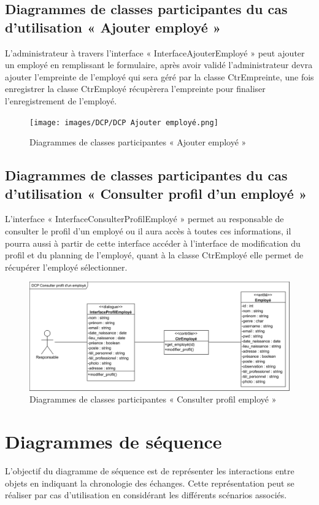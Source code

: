 \subsection*{Diagrammes de classes participantes du cas d'utilisation « Ajouter employé »}
L’administrateur à travers l’interface « InterfaceAjouterEmployé » peut ajouter
 un employé en remplissant le formulaire, après avoir validé l’administrateur 
 devra ajouter l’empreinte de l’employé qui sera géré par la classe 
 CtrEmpreinte, une fois enregistrer la classe CtrEmployé récupèrera l’empreinte 
 pour finaliser l’enregistrement de l’employé. 

\clearpage

\begin{figure}[h!]
    \centering
    \texttt{[image: images/DCP/DCP Ajouter employé.png]}
    \caption{Diagrammes de classes participantes « Ajouter employé »}
    \label{fig31}
\end{figure}
        
\subsection*{Diagrammes de classes participantes du cas d'utilisation « Consulter profil d'un employé »}
L’interface « InterfaceConsulterProfilEmployé » permet au responsable de 
consulter le profil d’un employé ou il aura accès à toutes ces informations, il 
pourra aussi à partir de cette interface accéder à l’interface de modification
du profil et du planning de l’employé, quant à la classe CtrEmployé elle permet 
de récupérer l’employé sélectionner. 

\begin{figure}[h!]
    \centering
    \includegraphics[scale=0.72]{images/DCP/DCP_consulter_profil_d'un_employe.png}
    \caption{Diagrammes de classes participantes « Consulter profil employé »}
    \label{fig32}
\end{figure}
             
\section{Diagrammes de séquence}
L’objectif du diagramme de séquence est de représenter les interactions entre 
objets en indiquant la chronologie des échanges. Cette représentation peut se 
réaliser par cas d’utilisation en considérant les différents scénarios 
associés.\cite{9} 
    
